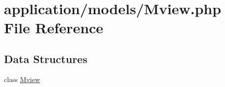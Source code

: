 \hypertarget{_mview_8php}{}\section{application/models/\+Mview.php File Reference}
\label{_mview_8php}
\subsection*{Data Structures}
\begin{DoxyCompactItemize}
\item 
class \mbox{\hyperlink{class_mview}{Mview}}
\end{DoxyCompactItemize}
